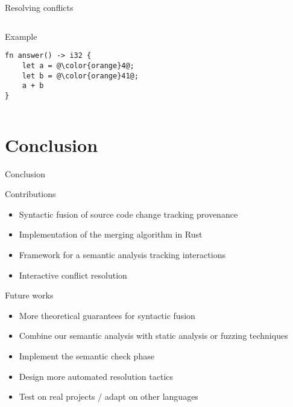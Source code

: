 \documentclass{beamer}
\begin{document}
\begin{frame}[fragile]{Resolving conflicts}
\begin{columns}
\begin{column}{0.48\textwidth}
\begin{exampleblock}{Example}
\begin{onlyenv}
\begin{lstlisting}
fn answer() -> i32 {
    let a = @\color{orange}4@;
    let b = @\color{orange}41@;
    a + b
}
\end{lstlisting}
\end{onlyenv}
\end{exampleblock}
\end{column}
\end{columns}
\end{frame}

\section*{Conclusion}
\begin{frame}{Conclusion}
\begin{block}{Contributions}
\begin{itemize}
 \item Syntactic fusion of source code change tracking provenance
 \item<2-> Implementation of the merging algorithm in Rust
 \item<3-> Framework for a semantic analysis tracking interactions
 \item<4-> Interactive conflict resolution
\end{itemize}
\end{block}
\begin{exampleblock}{Future works}
\begin{itemize}
 \item<5-> More theoretical guarantees for syntactic fusion
 \item<6-> Combine our semantic analysis with static analysis or fuzzing techniques
 \item<7-> Implement the semantic check phase
 \item<8-> Design more automated resolution tactics
 \item<9-> Test on real projects / adapt on other languages
\end{itemize}
\end{exampleblock}
\end{frame}
\end{document}
